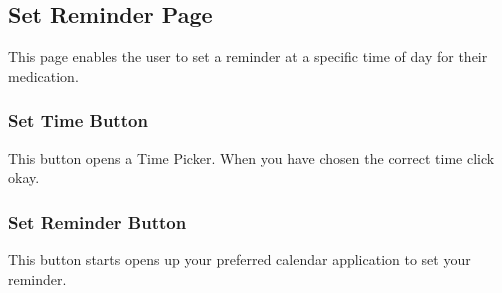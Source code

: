 \documentclass{article}
\begin{document}
\subsection{Set Reminder Page}
This page enables the user to set a  reminder at a specific time of day for their medication. 
\subsubsection{Set Time Button}
This button opens a Time Picker. When you have chosen the correct time click okay.
\subsubsection{Set Reminder Button}
This button starts opens up your preferred calendar application to set your reminder.
\end{document}
